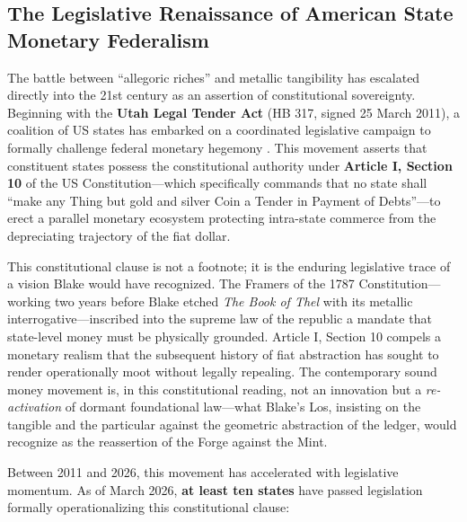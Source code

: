 \documentclass[
]{article}
\begin{document}
\subsection{The Legislative Renaissance of American State Monetary
Federalism}\label{the-legislative-renaissance-of-american-state-monetary-federalism}

The battle between ``allegoric riches'' and metallic tangibility has
escalated directly into the 21st century as an assertion of
constitutional sovereignty. Beginning with the \textbf{Utah Legal Tender
Act} (HB 317, signed 25 March 2011), a coalition of US states has
embarked on a coordinated legislative campaign to formally challenge
federal monetary hegemony
\citep{utah2011legal, greene2015understanding}. This movement asserts
that constituent states possess the constitutional authority under
\textbf{Article I, Section 10} of the US Constitution---which
specifically commands that no state shall ``make any Thing but gold and
silver Coin a Tender in Payment of Debts''---to erect a parallel
monetary ecosystem protecting intra-state commerce from the depreciating
trajectory of the fiat dollar.

This constitutional clause is not a footnote; it is the enduring
legislative trace of a vision Blake would have recognized. The Framers
of the 1787 Constitution---working two years before Blake etched
\emph{The Book of Thel} with its metallic interrogative---inscribed into
the supreme law of the republic a mandate that state-level money must be
physically grounded. Article I, Section 10 compels a monetary realism
that the subsequent history of fiat abstraction has sought to render
operationally moot without legally repealing. The contemporary sound
money movement is, in this constitutional reading, not an innovation but
a \emph{re-activation} of dormant foundational law---what Blake's Los,
insisting on the tangible and the particular against the geometric
abstraction of the ledger, would recognize as the reassertion of the
Forge against the Mint.

Between 2011 and 2026, this movement has accelerated with legislative
momentum. As of March 2026, \textbf{at least ten states} have passed
legislation formally operationalizing this constitutional clause:
\end{document}
